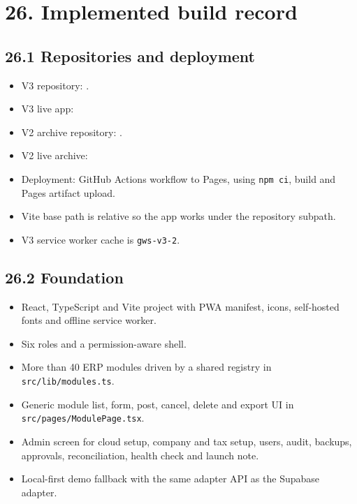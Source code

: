 \documentclass[11pt]{article}
\begin{document}
\section{26. Implemented build record}
\subsection{26.1 Repositories and deployment}
\begin{itemize}[leftmargin=*,itemsep=2pt,topsep=2pt]
\item V3 repository: .
\item V3 live app: 
\item V2 archive repository: .
\item V2 live archive: 
\item Deployment: GitHub Actions workflow to Pages, using \texttt{npm ci}, build and Pages artifact upload.
\item Vite base path is relative so the app works under the repository subpath.
\item V3 service worker cache is \texttt{gws-v3-2}.
\end{itemize}
\subsection{26.2 Foundation}
\begin{itemize}[leftmargin=*,itemsep=2pt,topsep=2pt]
\item React, TypeScript and Vite project with PWA manifest, icons, self-hosted fonts and offline service worker.
\item Six roles and a permission-aware shell.
\item More than 40 ERP modules driven by a shared registry in \texttt{src/lib/modules.ts}.
\item Generic module list, form, post, cancel, delete and export UI in \texttt{src/pages/ModulePage.tsx}.
\item Admin screen for cloud setup, company and tax setup, users, audit, backups, approvals, reconciliation, health check and launch note.
\item Local-first demo fallback with the same adapter API as the Supabase adapter.
\end{itemize}
\end{document}
